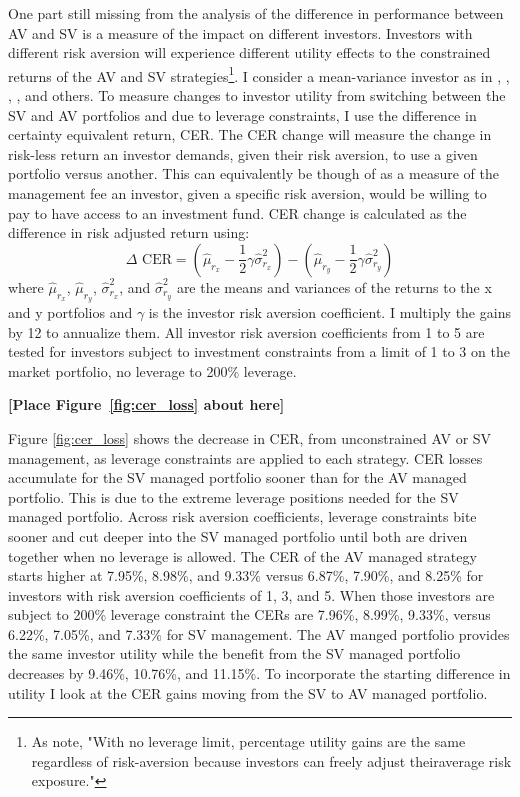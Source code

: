 One part still missing from the analysis of the difference in performance between AV and SV is a measure of the impact on different investors. Investors with different risk aversion will experience different utility effects to the constrained returns of the AV and SV strategies\footnote{As \citet{moreira_volatility-managed_2017} note, "With no leverage limit, percentage utility gains are the same regardless of risk-aversion because investors can freely adjust theiraverage risk exposure."}. I consider a mean-variance investor as in \cite{Kandel1996}, \cite{Campbell2008}, \cite{Ferreira2011}, \cite{Rapach2016}, and others. To measure changes to investor utility from switching between the SV and AV portfolios and due to leverage constraints, I use the difference in certainty equivalent return, CER. The CER change will measure the change in risk-less return an investor demands, given their risk aversion, to use a given portfolio versus another. This can equivalently be though of as a measure of the management fee an investor, given a specific risk aversion, would be willing to pay to have access to an investment fund. CER change is calculated as the difference in risk adjusted return using:
\begin{equation}
\Delta \text{ CER} = \left(\hat \mu_{r_{x}} - \frac{1}{2}\gamma\hat \sigma^{2}_{r_{x}}\right) - \left(\hat \mu_{r_{y}} - \frac{1}{2}\gamma\hat \sigma^{2}_{r_{y}}\right)
\end{equation}
where $\hat \mu_{r_{x}}$, $\hat \mu_{r_{y}}$, $\hat \sigma^{2}_{r_{x}}$, and $\hat \sigma^{2}_{r_{y}}$ are the means and
variances of the returns to the x and y portfolios and $\gamma$ is the investor risk aversion coefficient. I multiply the gains by 12 to annualize them. All investor risk aversion coefficients from 1 to 5 are tested for investors subject to investment constraints from a limit of 1 to 3 on the market portfolio, no leverage to 200\% leverage.

\bigskip
\centerline{\bf [Place Figure~\ref{fig:cer_loss} about here]}
\bigskip

Figure \ref{fig:cer_loss} shows the decrease in CER, from unconstrained AV or SV management, as leverage constraints are applied to each strategy. CER losses accumulate for the SV managed portfolio sooner than for the AV managed portfolio. This is due to the extreme leverage positions needed for the SV managed portfolio. Across risk aversion coefficients, leverage constraints bite sooner and cut deeper into the SV managed portfolio until both are driven together when no leverage is allowed. The CER of the AV managed strategy starts higher at 7.95\%, 8.98\%, and 9.33\% versus 6.87\%, 7.90\%, and 8.25\% for investors with risk aversion coefficients of 1, 3, and 5. When those investors are subject to 200\% leverage constraint the CERs are 7.96\%, 8.99\%, 9.33\%, versus 6.22\%, 7.05\%, and 7.33\% for SV management. The AV manged portfolio provides the same investor utility while the benefit from the SV managed portfolio decreases by 9.46\%, 10.76\%, and 11.15\%. To incorporate the starting difference in utility I look at the CER gains moving from the SV to AV managed portfolio. 


